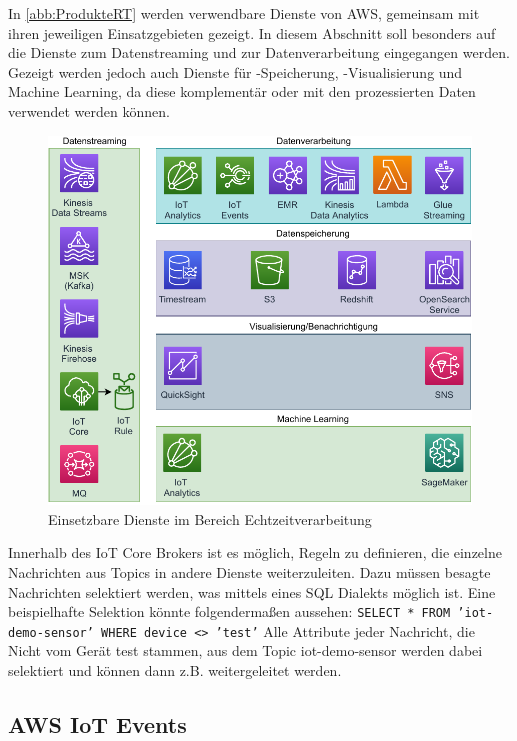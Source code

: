 In \autoref{abb:ProdukteRT} werden verwendbare Dienste von \ac{AWS}, gemeinsam mit ihren jeweiligen Einsatzgebieten gezeigt. In diesem Abschnitt soll besonders auf die Dienste zum Datenstreaming und zur Datenverarbeitung eingegangen werden. Gezeigt werden jedoch auch Dienste für -Speicherung, -Visualisierung und Machine Learning, da diese komplementär oder mit den prozessierten Daten verwendet werden können.
\begin{figure}[H]
\centering
\includegraphics[width=\textwidth]{graphics/Overview-Realtime.pdf}
\caption{Einsetzbare Dienste im Bereich Echtzeitverarbeitung}
\label{abb:ProdukteRT}
\end{figure}


Innerhalb des \ac{IoT} Core Brokers ist es möglich, Regeln zu definieren, die einzelne Nachrichten aus Topics in andere Dienste weiterzuleiten. Dazu müssen besagte Nachrichten selektiert werden, was mittels eines SQL Dialekts möglich ist. Eine beispielhafte Selektion könnte folgendermaßen aussehen: \texttt{SELECT * FROM 'iot-demo-sensor' WHERE device <> 'test'}
Alle Attribute jeder Nachricht, die Nicht vom Gerät test stammen, aus dem Topic iot-demo-sensor werden dabei selektiert und können dann z.B. weitergeleitet werden.

\subsection{AWS IoT Events}




